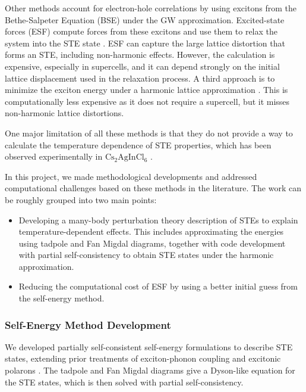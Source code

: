 \documentclass[11pt]{article}
\begin{document}
Other methods account for electron-hole correlations by using excitons from the
Bethe-Salpeter Equation (BSE) under the GW approximation. Excited-state forces
(ESF) compute forces from these excitons and use them to relax the system into
the STE state \cite{ismailbeigi2003esf,delgrande2025esf}. ESF can capture the
large lattice distortion that forms an STE, including non-harmonic effects.
However, the calculation is expensive, especially in supercells, and it can
depend strongly on the initial lattice displacement used in the relaxation
process. A third approach is to minimize the exciton energy under a harmonic
lattice approximation \cite{dai2024theory,dai2024firstprinciples}. This is
computationally less expensive as it does not require a supercell, but it misses
non-harmonic lattice distortions.

One major limitation of all these methods is that they do not provide a way to
calculate the temperature dependence of STE properties, which has been observed
experimentally in \(\mathrm{Cs_2AgInCl_6}\) \cite{singh2024ultrafast}.

In this project, we made methodological developments and addressed
computational challenges based on these methods in the literature. The work
can be roughly grouped into two main points:
\begin{itemize}
\item Developing a many-body perturbation theory description of
STEs to explain temperature-dependent effects. This
includes approximating the energies using tadpole and Fan Migdal diagrams,
together with code development with partial self-consistency to obtain STE
states under the harmonic approximation.
\item Reducing the computational cost of ESF by using a better initial guess
from the self-energy method.
\end{itemize}

\subsubsection{Self-Energy Method Development}

We developed partially self-consistent self-energy formulations to describe
STE states, extending prior treatments of exciton-phonon coupling and
excitonic polarons \cite{antonius2022theory,dai2024theory,dai2024firstprinciples}.
The tadpole and Fan Migdal diagrams give a Dyson-like equation for the STE
states, which is then solved with partial self-consistency.
\end{document}
